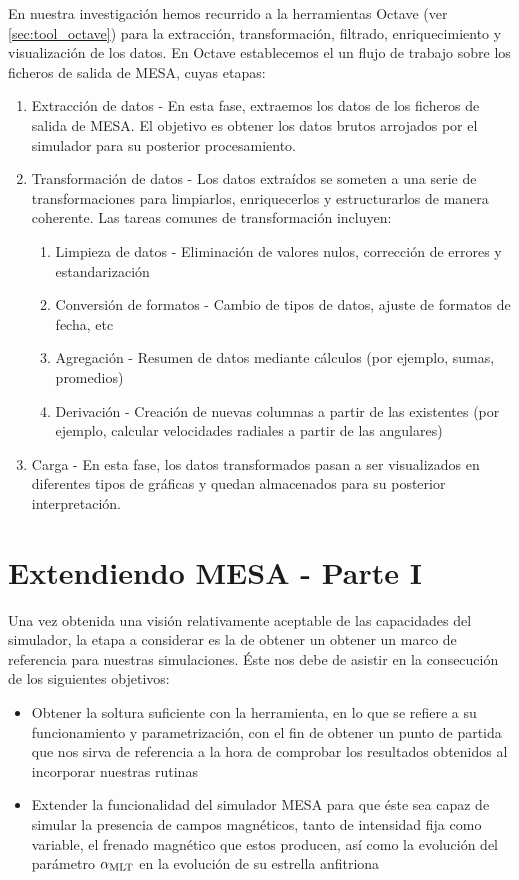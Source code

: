 En nuestra investigación hemos recurrido a la herramientas Octave (ver \ref{sec:tool_octave}) para la extracción, transformación, filtrado, enriquecimiento y visualización de los datos. En Octave establecemos el un flujo de trabajo sobre los ficheros de salida de MESA, cuyas etapas:
\begin{enumerate}
	\item Extracción de datos - En esta fase, extraemos los datos de los ficheros de salida de MESA. El objetivo es obtener los datos brutos arrojados por el simulador para su posterior procesamiento.
	\item Transformación de datos - Los datos extraídos se someten a una serie de transformaciones para limpiarlos, enriquecerlos y estructurarlos de manera coherente. Las tareas comunes de transformación incluyen:
	\begin{enumerate}
		\item Limpieza de datos - Eliminación de valores nulos, corrección de errores y estandarización
		\item Conversión de formatos - Cambio de tipos de datos, ajuste de formatos de fecha, etc
		\item Agregación - Resumen de datos mediante cálculos (por ejemplo, sumas, promedios)
		\item Derivación - Creación de nuevas columnas a partir de las existentes (por ejemplo, calcular velocidades radiales a partir de las angulares)
	\end{enumerate}
	\item Carga -  En esta fase, los datos transformados pasan a ser visualizados en diferentes tipos de gráficas y quedan almacenados para su posterior interpretación. 
\end{enumerate}

\section{Extendiendo MESA - Parte I} \label{mesa_parte1}
Una vez obtenida una visión relativamente aceptable de las capacidades del simulador, la etapa a considerar es la de obtener un obtener un marco de referencia para nuestras simulaciones. Éste nos debe de asistir en la consecución de los siguientes objetivos:

\begin{itemize}
    \item Obtener la soltura suficiente con la herramienta, en lo que se refiere a su funcionamiento y parametrización, con el fin de obtener un punto de partida que nos sirva de referencia a la hora de comprobar los resultados obtenidos al incorporar nuestras rutinas
    \item Extender la funcionalidad del simulador MESA para que éste sea capaz de simular la presencia de campos magnéticos, tanto de intensidad fija como variable, el frenado magnético que estos producen, así como la evolución del parámetro $\alpha_{\mathrm{MLT}}$ en la evolución de su estrella anfitriona
\end{itemize}

